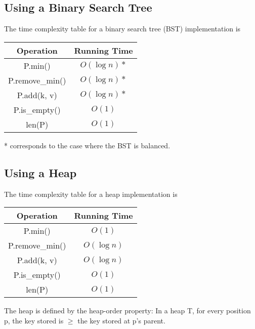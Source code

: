 \documentclass[]{article}
\begin{document}
\subsection{Using a Binary Search Tree}\bigbreak

The time complexity table for a binary search tree (BST) implementation is

\begin{center}
	\begin{table}[h!]\centering
		\begin{tabular}{|c|c|}
			\hline
			Operation   & Running Time\\\hline
			P.min() & $O(\log n)*$\\
			P.remove\_min() & $O(\log n)*$\\
			P.add(k, v) & $O(\log n)*$\\
			P.is\_empty() & $O(1)$\\
			len(P) & $O(1)$\\\hline
		\end{tabular}
	\end{table}
\end{center}\bigbreak

* corresponds to the case where the BST is balanced.\\

\subsection{Using a Heap}\bigbreak

The time complexity table for a heap implementation is

\begin{center}
	\begin{table}[h!]\centering
		\begin{tabular}{|c|c|}
			\hline
			Operation   & Running Time\\\hline
			P.min() & $O(1)$\\
			P.remove\_min() & $O(\log n)$\\
			P.add(k, v) & $O(\log n)$\\
			P.is\_empty() & $O(1)$\\
			len(P) & $O(1)$\\\hline
		\end{tabular}
	\end{table}
\end{center}\bigbreak

The heap is defined by the heap-order property: In a heap T, for every position p, the key stored is $\geq$ the key stored at p's parent. \\
\end{document}
